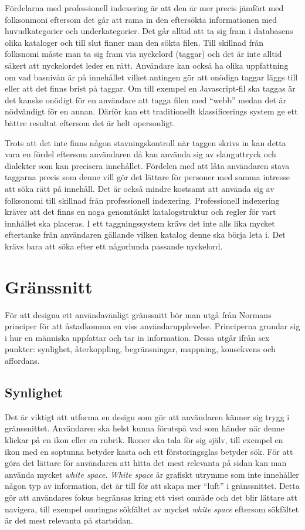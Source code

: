 \documentclass[a4paper,12pt,oneside,final]{extbook}
\begin{document}
Fördelarna med professionell indexering är att den är mer precis jämfört med folksonmoni eftersom det går att rama in den eftersökta informationen med huvudkategorier och underkategorier. Det går alltid att ta sig fram i databasens olika kataloger och till slut finner man den sökta filen. Till skillnad från folksnomi måste man ta sig fram via nyckelord (taggar) och det är inte alltid säkert att nyckelordet leder en rätt. Användare kan också ha olika uppfattning om vad basnivån är på innehållet vilket antingen gör att onödiga taggar läggs till eller att det finns brist på taggar. Om till exempel en Javascript-fil ska taggas är det kanske onödigt för en användare att tagga filen med “webb” medan det är nödvändigt för en annan. Därför kan ett traditionellt klassificerings system ge ett bättre resultat eftersom det är helt opersonligt.

Trots att det inte finns någon stavningskontroll när taggen skrivs in kan detta vara en fördel eftersom användaren då kan använda sig av slanguttryck och dialekter som kan precisera innehållet. Fördelen med att låta användaren stava taggarna precis som denne vill gör det lättare för personer med samma intresse att söka rätt på innehåll. Det är också mindre kostsamt att använda sig av folksonomi till skillnad från professionell indexering. Professionell indexering kräver att det finns en noga genomtänkt katalogstruktur och regler för vart innhållet ska placeras. I ett taggningssystem krävs det inte alls lika mycket eftertanke från användaren gällande vilken katalog denne ska börja leta i. Det krävs bara att söka efter ett någorlunda passande nyckelord.

\section{Gränssnitt}
För att designa ett användavänligt gränssnitt bör man utgå från Normans principer\cite{norman} för att åstadkomma en viss användarupplevelse. Principerna grundar sig i hur en människa uppfattar och tar in information. Dessa utgår ifrån sex punkter: synlighet, återkoppling, begränsningar, mappning, konsekvens och affordans.

\subsection{Synlighet}
Det är viktigt att utforma en design som gör att användaren känner sig trygg i gränssnittet. Användaren ska helst kunna förutspå vad som händer när denne klickar på en ikon eller en rubrik. Ikoner ska tala för sig själv, till exempel en ikon med en soptunna betyder kasta och ett förstoringsglas betyder sök. För att göra det lättare för användaren att hitta det mest relevanta på sidan kan man använda mycket \textit{white space}\cite{whitespace}. \textit{White space} är grafiskt utrymme som inte innehåller någon typ av information, det är till för att skapa mer “luft” i gränssnittet. Detta gör att användares fokus begränsas kring ett visst område och det blir lättare att navigera, till exempel omringas sökfältet av mycket \textit{white space} eftersom sökfältet är det mest relevanta på startsidan.
\end{document}
